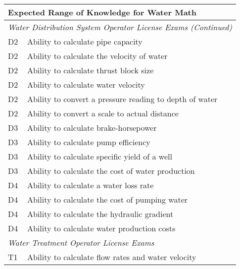 \begin{table}[H]
\begin{tabular}{| m{1cm} |m{15cm} |}
\hline
\multicolumn{2}{|l|}{\textbf{Expected   Range of Knowledge for Water Math}}                                                                      \\ \hline
\multicolumn{2}{|l|}{\textit{Water   Distribution System Operator License Exams (Continued)}}                                                                  \\ \hline
D2 & Ability to calculate   pipe capacity                                         \\ \hline
D2 & Ability to calculate   the velocity of water                                 \\ \hline
D2 & Ability to calculate   thrust block size                                     \\ \hline
D2 & Ability to calculate   water velocity                                        \\ \hline
D2 & Ability to convert a   pressure reading to depth of water                    \\ \hline
D2 & Ability to convert a   scale to actual distance                              \\ \hline
D3 & Ability to calculate   brake-horsepower                                      \\ \hline
D3 & Ability to calculate   pump efficiency                                       \\ \hline
D3 & Ability to calculate   specific yield of a well                              \\ \hline
D3 & Ability to calculate   the cost of water production                          \\ \hline
D4 & Ability to calculate a water loss rate                                       \\ \hline
D4 & Ability to calculate the cost of pumping   water                             \\ \hline
D4 & Ability to calculate the hydraulic gradient                                  \\ \hline
D4 & Ability to calculate water production costs                                  \\ \hline
\multicolumn{2}{|l|}{\textit{Water   Treatment Operator License Exams}}                                                                  \\ \hline
T1 & Ability to calculate   flow rates and water velocity                         \\ \hline

\end{tabular}
\end{table}
